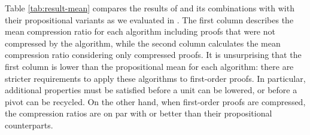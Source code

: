 Table \ref{tab:result-mean} compares the results of {\FORPI} and its combinations with {\GFOLU} with their propositional variants as we evaluated in \cite{Boudou}. 
The first column describes the mean compression ratio for each algorithm including proofs that were not compressed by the algorithm, while the second column calculates the mean compression ratio considering only compressed proofs. 
It is unsurprising that the first column is lower than the propositional mean for each algorithm: there are stricter requirements to apply these algorithms to first-order proofs. 
In particular, additional properties must be satisfied before a unit can be lowered, or before a pivot can be recycled. 
On the other hand, when first-order proofs are compressed, the compression ratios are on par with or better than their propositional counterparts.

